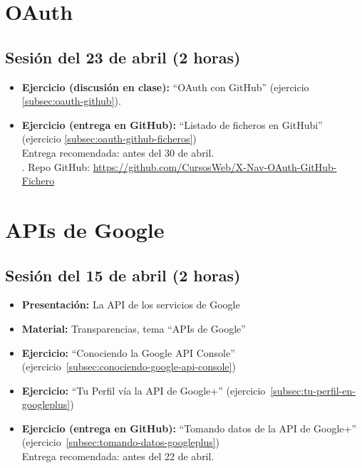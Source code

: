 \documentclass[a4paper,12pt]{report}
\begin{document}
\section{OAuth}

\subsection{Sesión del 23 de abril (2 horas)}

\begin{itemize}
\item \textbf{Ejercicio (discusión en clase):} ``OAuth con GitHub'' (ejercicio \ref{subsec:oauth-github}).
\item \textbf{Ejercicio (entrega en GitHub):} ``Listado de ficheros en GitHubi'' (ejercicio \ref{subsec:oauth-github-ficheros})  \\
  Entrega recomendada: antes del 30 de abril. \\.
  Repo GitHub: \url{https://github.com/CursosWeb/X-Nav-OAuth-GitHub-Fichero}
\end{itemize}


\section{APIs de Google}

\subsection{Sesión del 15 de abril (2 horas)}

\begin{itemize}
 \item \textbf{Presentación:} La API de los servicios de Google
 \item \textbf{Material:} Transparencias, tema ``APIs de Google''
 \item \textbf{Ejercicio:} ``Conociendo la Google API Console'' (ejercicio~\ref{subsec:conociendo-google-api-console})
  \item \textbf{Ejercicio:} ``Tu Perfil vía la API de Google+'' (ejercicio~\ref{subsec:tu-perfil-en-googleplus})
 \item \textbf{Ejercicio (entrega en GitHub):} ``Tomando datos de la API de Google+'' (ejercicio~\ref{subsec:tomando-datos-googleplus}) 
 \\
Entrega recomendada: antes del 22 de abril.
\end{itemize}
\end{document}
